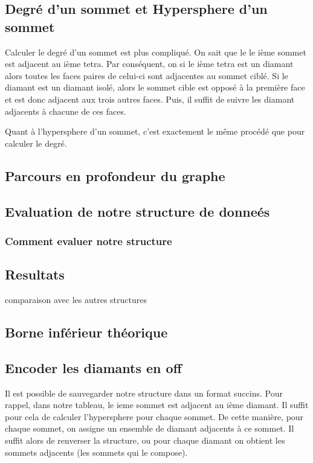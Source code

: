 \documentclass[a4paper,11pt,openany]{article}
\begin{document}
\subsection{Degré d'un sommet et Hypersphere d'un sommet}
Calculer le degré d'un sommet est plus compliqué. On sait que le le ième sommet est adjacent au ième tetra. Par conséquent, on si le ième tetra est un diamant alors toutes les faces paires de celui-ci sont adjacentes au sommet ciblé. Si le diamant est un diamant isolé, alors le sommet cible est opposé à la première face et est donc adjacent aux trois autres faces. Puis, il suffit de suivre les diamant adjacents à chacune de ces faces.

Quant à l'hypersphere d'un sommet, c'est exactement le même procédé que pour calculer le degré.
\subsection{Parcours en profondeur du graphe}


\subsection{Evaluation de notre structure de donneés}
\subsubsection{Comment evaluer notre structure}
\subsection{Resultats}
comparaison avec les autres structures
\subsection{Borne inférieur théorique}

\subsection{Encoder les diamants en off}
Il est possible de sauvegarder notre structure dans un format succins. Pour rappel, dans notre tableau, le ieme sommet est adjacent au ième diamant.
Il suffit pour cela de calculer l'hypersphere pour chaque sommet. De cette manière, pour chaque sommet, on assigne un ensemble de diamant adjacents à ce sommet. Il suffit alors de renverser la structure, ou pour chaque diamant on obtient les sommets adjacents (les sommets qui le compose).
\end{document}
